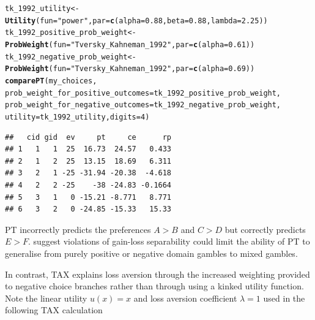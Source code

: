 \documentclass{article}\usepackage[]{graphicx}\usepackage[]{color}
\makeatletter
\newcommand{\hlnum}[1]{\textcolor[rgb]{0.686,0.059,0.569}{#1}}%
\newcommand{\hlstr}[1]{\textcolor[rgb]{0.192,0.494,0.8}{#1}}%
\newcommand{\hlstd}[1]{\textcolor[rgb]{0.345,0.345,0.345}{#1}}%
\newcommand{\hlkwb}[1]{\textcolor[rgb]{0.69,0.353,0.396}{#1}}%
\newcommand{\hlkwc}[1]{\textcolor[rgb]{0.333,0.667,0.333}{#1}}%
\newcommand{\hlkwd}[1]{\textcolor[rgb]{0.737,0.353,0.396}{\textbf{#1}}}%
\newenvironment{kframe}{%
 \def\at@end@of@kframe{}%
 \ifinner\ifhmode%
  \def\at@end@of@kframe{\end{minipage}}%
  \begin{minipage}{\columnwidth}%
 \fi\fi%
 \def\FrameCommand##1{\hskip\@totalleftmargin \hskip-\fboxsep
 \colorbox{shadecolor}{##1}\hskip-\fboxsep
     \hskip-\linewidth \hskip-\@totalleftmargin \hskip\columnwidth}%
 \MakeFramed {\advance\hsize-\width
   \@totalleftmargin\z@ \linewidth\hsize
   \@setminipage}}%
 {\par\unskip\endMakeFramed%
 \at@end@of@kframe}
\newenvironment{knitrout}{}{} %
\makeatother
\begin{document}
\begin{knitrout}
\color{fgcolor}\begin{kframe}
\begin{alltt}
\hlstd{tk_1992_utility} \hlkwb{<-} \hlkwd{Utility}\hlstd{(}\hlkwc{fun}\hlstd{=}\hlstr{"power"}\hlstd{,} \hlkwc{par}\hlstd{=}\hlkwd{c}\hlstd{(}\hlkwc{alpha}\hlstd{=}\hlnum{0.88}\hlstd{,} \hlkwc{beta}\hlstd{=}\hlnum{0.88}\hlstd{,} \hlkwc{lambda}\hlstd{=}\hlnum{2.25}\hlstd{))}
\hlstd{tk_1992_positive_prob_weight} \hlkwb{<-} \hlkwd{ProbWeight}\hlstd{(}\hlkwc{fun}\hlstd{=}\hlstr{"Tversky_Kahneman_1992"}\hlstd{,} \hlkwc{par}\hlstd{=}\hlkwd{c}\hlstd{(}\hlkwc{alpha}\hlstd{=}\hlnum{0.61}\hlstd{))}
\hlstd{tk_1992_negative_prob_weight} \hlkwb{<-} \hlkwd{ProbWeight}\hlstd{(}\hlkwc{fun}\hlstd{=}\hlstr{"Tversky_Kahneman_1992"}\hlstd{,} \hlkwc{par}\hlstd{=}\hlkwd{c}\hlstd{(}\hlkwc{alpha}\hlstd{=}\hlnum{0.69}\hlstd{))}
\hlkwd{comparePT}\hlstd{(my_choices,}
        \hlkwc{prob_weight_for_positive_outcomes}\hlstd{=tk_1992_positive_prob_weight,}
        \hlkwc{prob_weight_for_negative_outcomes}\hlstd{=tk_1992_negative_prob_weight,}
        \hlkwc{utility}\hlstd{=tk_1992_utility,} \hlkwc{digits}\hlstd{=}\hlnum{4}\hlstd{)}
\end{alltt}
\begin{verbatim}
##   cid gid  ev     pt     ce      rp
## 1   1   1  25  16.73  24.57   0.433
## 2   1   2  25  13.15  18.69   6.311
## 3   2   1 -25 -31.94 -20.38  -4.618
## 4   2   2 -25    -38 -24.83 -0.1664
## 5   3   1   0 -15.21 -8.771   8.771
## 6   3   2   0 -24.85 -15.33   15.33
\end{verbatim}
\end{kframe}
\end{knitrout}


PT incorrectly predicts the preferences $A > B$ and $C > D$ but correctly predicts $E > F$.
\cite{Por_Budescu_2013} suggest violations of gain-loss separability could limit the ability of PT to generalise from purely positive or negative domain gambles to mixed gambles.

In contrast, TAX explains loss aversion through the increased weighting provided to negative choice branches
rather than through using a kinked utility function. Note the linear utility $u(x) = x$ and loss aversion coefficient $\lambda = 1$ used in the following TAX calculation
\end{document}
